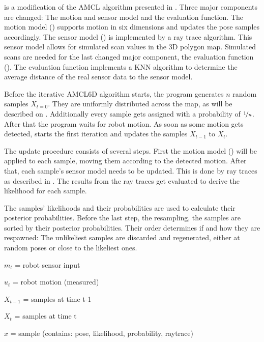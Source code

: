 \documentclass[Thesis.tex]{subfiles}
\begin{document}
%
 is a modification of the \gls{AMCL} algorithm presented in \cite{ThrunBurgardFox:2005}. Three major components are changed: The motion and sensor model and the evaluation function. The motion model () supports motion in six dimensions and updates the pose samples accordingly. The sensor model () is implemented by a ray trace algorithm. This sensor model allows for simulated scan values in the 3D polygon map. Simulated scans are needed for the last changed major component, the evaluation function (). The evaluation function implements a \gls{KNN} algorithm to determine the average distance of the real sensor data to the sensor model.

Before the iterative \gls{AMCL6D} algorithm starts, the program generates $n$ random samples $X_{t=0}$. They are uniformly distributed across the map, as will be described on . Additionally every sample gets assigned with a probability of $\nicefrac{1}{n}$.  After that the program waits for robot motion. As soon as some motion gets detected,  starts the first iteration and updates the samples $X_{t-1}$ to $X_{t}$.

The update procedure consists of several steps. First the motion model () will be applied to each sample, moving them according to the detected motion. After that, each sample's sensor model needs to be updated. This is done by ray traces as described in . The results from the ray traces get evaluated to derive the likelihood for each sample.

The samples' likelihoods and their probabilities are used to calculate their posterior probabilities. Before the last step, the resampling, the samples are sorted by their posterior probabilities. Their order determines if and how they are respawned: The unlikeliest samples are discarded and regenerated, either at random poses or close to the likeliest ones.



$m_{t}$ = robot sensor input

$u_{t}$ = robot motion (measured)

$X_{t-1}$ = samples at time t-1

$X_{t}$ = samples at time t

$x$ = sample (contains: pose, likelihood, probability, raytrace)
\end{document}
